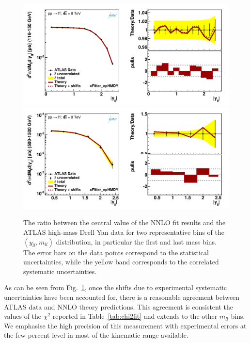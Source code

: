 \begin{figure}[t]
\centering
\includegraphics[width=16cm]{figs/data_401-1.pdf}\\
\includegraphics[width=16cm]{figs/data_405-1.pdf}\\
\caption{The ratio between the central value of the NNLO fit results
  and the ATLAS high-mass Drell Yan data
  for two representative bins of the $(y_{ll},m_{ll})$ distribution,
  in particular the first and last mass bins.
  The error bars on the data points correspond to the statistical
  uncertainties, while the yellow band
  corresponds to the correlated systematic uncertainties.
}
\label{hmDY_2D}
\end{figure}

As can be seen from Fig.~\ref{hmDY_2D}, once the shifts due to
experimental systematic uncertainties have been accounted for, there
is a reasonable agreement between ATLAS data and NNLO theory
predictions.
%
This agreement is consistent the values of the $\chi^2$ reported in
Table~\ref{tab:chi2fit} and extends to the other $m_{ll}$ bins.
%
We emphasise the high precision of this measurement with experimental
errors at the few percent level in most of the kinematic range
available.


